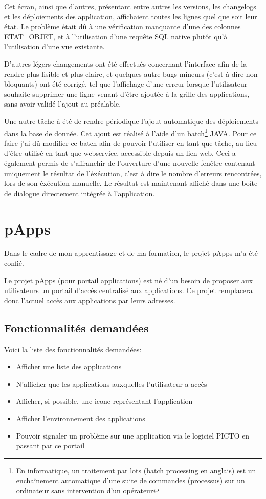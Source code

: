\documentclass[12pt]{report}
\begin{document}
    Cet écran, ainsi que d'autres, présentant entre autres les versions, les changelogs et les déploiements des application, affichaient toutes les lignes quel que soit leur état. Le problème était dû à une vérification manquante d'une des colonnes ETAT\_OBJET, et à l'utilisation d'une requête SQL native plutôt qu'à l'utilisation d'une vue existante.
    
    D'autres légers changements ont été effectués concernant l'interface afin de la rendre plus lisible et plus claire, et quelques autre bugs mineurs (c'est à dire non bloquants) ont été corrigé, tel que l'affichage d'une erreur lorsque l'utilisateur souhaite supprimer une ligne venant d'être ajoutée à la grille des applications, sans avoir validé l'ajout au préalable.
    
    Une autre tâche à été de rendre périodique l'ajout automatique des déploiements dans la base de donnée. Cet ajout est réalisé à l'aide d'un batch\footnote{En informatique, un traitement par lots (batch processing en anglais) est un enchaînement automatique d'une suite de commandes (processus) sur un ordinateur sans intervention d'un opérateur\cite{wiki:batch}} JAVA. Pour ce faire j'ai dû modifier ce batch afin de pouvoir l'utiliser en tant que tâche, au lieu d'être utilisé en tant que webservice, accessible depuis un lien web. Ceci a également permis de s'affranchir de l'ouverture d'une nouvelle fenêtre contenant uniquement le résultat de l'éxécution, c'est à dire le nombre d'erreurs rencontrées, lors de son éxécution manuelle. Le résultat est maintenant affiché dans une boîte de dialogue directement intégrée à l'application.
    
    \newpage
    
    \section{pApps}
    Dans le cadre de mon apprentissage et de ma formation, le projet pApps m'a été confié.
    
    Le projet pApps (pour portail applications) est né d'un besoin de proposer aux utilisateurs un portail d'accès centralisé aux applications. Ce projet remplacera donc l'actuel accès aux applications par leurs adresses.
    
    \subsection{Fonctionnalités demandées}
    Voici la liste des fonctionnalités demandées:\vspace{-1em}
    \begin{itemize}
        \item Afficher une liste des applications
        \item N'afficher que les applications auxquelles l'utilisateur a accès
        \item Afficher, si possible, une icone représentant l'application
        \item Afficher l'environnement des applications
        \item Pouvoir signaler un problème sur une application via le logiciel PICTO en passant par ce portail
    \end{itemize}
    
\end{document}
